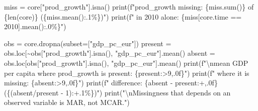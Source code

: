 \documentclass[
  letterpaper,
  10pt,
  twoside,
  openright,
  numbers=noenddot,
  chapterprefix=true]{scrbook}
\newenvironment{Shaded}{}{}
\newcommand{\BuiltInTok}[1]{\textcolor[rgb]{0.84,0.23,0.29}{#1}}
\newcommand{\CharTok}[1]{\textcolor[rgb]{0.01,0.18,0.38}{#1}}
\newcommand{\DecValTok}[1]{\textcolor[rgb]{0.00,0.36,0.77}{#1}}
\newcommand{\NormalTok}[1]{\textcolor[rgb]{0.14,0.16,0.18}{#1}}
\newcommand{\OperatorTok}[1]{\textcolor[rgb]{0.14,0.16,0.18}{#1}}
\newcommand{\SpecialCharTok}[1]{\textcolor[rgb]{0.00,0.36,0.77}{#1}}
\newcommand{\SpecialStringTok}[1]{\textcolor[rgb]{0.01,0.18,0.38}{#1}}
\newcommand{\StringTok}[1]{\textcolor[rgb]{0.01,0.18,0.38}{#1}}
\begin{document}
\label{check-missing}
\begin{Shaded}
\begin{Highlighting}[]
\NormalTok{miss }\OperatorTok{=}\NormalTok{ core[}\StringTok{"prod\_growth"}\NormalTok{].isna()}
\BuiltInTok{print}\NormalTok{(}\SpecialStringTok{f"prod\_growth missing: }\SpecialCharTok{\{}\NormalTok{miss}\SpecialCharTok{.}\BuiltInTok{sum}\NormalTok{()}\SpecialCharTok{\}}\SpecialStringTok{ of }\SpecialCharTok{\{}\BuiltInTok{len}\NormalTok{(core)}\SpecialCharTok{\}}\SpecialStringTok{ (}\SpecialCharTok{\{}\NormalTok{miss}\SpecialCharTok{.}\NormalTok{mean()}\SpecialCharTok{:.1\%\}}\SpecialStringTok{)"}\NormalTok{)}
\BuiltInTok{print}\NormalTok{(}\SpecialStringTok{f"  in 2010 alone:     }\SpecialCharTok{\{}\NormalTok{miss[core.time }\OperatorTok{==} \DecValTok{2010}\NormalTok{]}\SpecialCharTok{.}\NormalTok{mean()}\SpecialCharTok{:.0\%\}}\SpecialStringTok{"}\NormalTok{)}

\NormalTok{obs }\OperatorTok{=}\NormalTok{ core.dropna(subset}\OperatorTok{=}\NormalTok{[}\StringTok{"gdp\_pc\_eur"}\NormalTok{])}
\NormalTok{present }\OperatorTok{=}\NormalTok{ obs.loc[}\OperatorTok{\textasciitilde{}}\NormalTok{obs[}\StringTok{"prod\_growth"}\NormalTok{].isna(), }\StringTok{"gdp\_pc\_eur"}\NormalTok{].mean()}
\NormalTok{absent }\OperatorTok{=}\NormalTok{ obs.loc[obs[}\StringTok{"prod\_growth"}\NormalTok{].isna(), }\StringTok{"gdp\_pc\_eur"}\NormalTok{].mean()}
\BuiltInTok{print}\NormalTok{(}\SpecialStringTok{f"}\CharTok{\textbackslash{}n}\SpecialStringTok{mean GDP per capita where prod\_growth is present: }\SpecialCharTok{\{}\NormalTok{present}\SpecialCharTok{:\textgreater{}9,.0f\}}\SpecialStringTok{"}\NormalTok{)}
\BuiltInTok{print}\NormalTok{(}\SpecialStringTok{f"                          where it is missing:   }\SpecialCharTok{\{}\NormalTok{absent}\SpecialCharTok{:\textgreater{}9,.0f\}}\SpecialStringTok{"}\NormalTok{)}
\BuiltInTok{print}\NormalTok{(}\SpecialStringTok{f"  difference: }\SpecialCharTok{\{}\NormalTok{absent }\OperatorTok{{-}}\NormalTok{ present}\SpecialCharTok{:+,.0f\}}\SpecialStringTok{  (}\SpecialCharTok{\{}\NormalTok{(absent}\OperatorTok{/}\NormalTok{present }\OperatorTok{{-}} \DecValTok{1}\NormalTok{)}\SpecialCharTok{:+.1\%\}}\SpecialStringTok{)"}\NormalTok{)}
\BuiltInTok{print}\NormalTok{(}\StringTok{"}\CharTok{\textbackslash{}n}\StringTok{Missingness that depends on an observed variable is MAR, not MCAR."}\NormalTok{)}
\end{Highlighting}
\end{Shaded}
\end{document}
